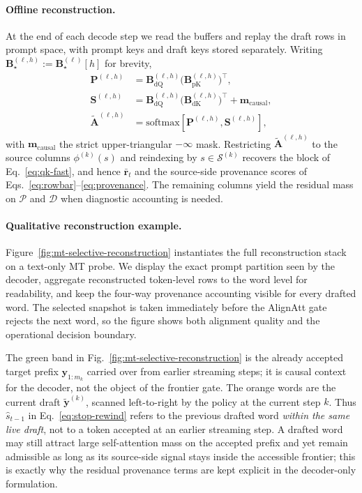 \documentclass[11pt,twocolumn]{article}
\begin{document}
\paragraph{Offline reconstruction.}
At the end of each decode step we read the buffers and replay the draft rows in
prompt space, with prompt keys and draft keys stored separately.
Writing $\mathbf{B}^{(\ell,h)}_\star := \mathbf{B}^{(\ell)}_\star[h]$ for brevity,
\begin{align}
  \mathbf{P}^{(\ell,h)} &=
  \mathbf{B}^{(\ell,h)}_{\mathrm{dQ}}
  \bigl(\mathbf{B}^{(\ell,h)}_{\mathrm{pK}}\bigr)^{\!\top},
  \label{eq:prompt-logits}\\
  \mathbf{S}^{(\ell,h)} &=
  \mathbf{B}^{(\ell,h)}_{\mathrm{dQ}}
  \bigl(\mathbf{B}^{(\ell,h)}_{\mathrm{dK}}\bigr)^{\!\top}
  + \mathbf{m}_{\mathrm{causal}},
  \label{eq:suffix-logits}\\
  \widetilde{\mathbf{A}}^{(\ell,h)}
  &= \mathrm{softmax}[\mathbf{P}^{(\ell,h)}, \mathbf{S}^{(\ell,h)}],
  \label{eq:vllm-softmax}
\end{align}
with $\mathbf{m}_{\mathrm{causal}}$ the strict upper-triangular $-\infty$
mask. Restricting $\widetilde{\mathbf{A}}^{(\ell,h)}$ to the source columns
$\phi^{(k)}(s)$ and reindexing by $s \in \mathcal{S}^{(k)}$ recovers the block
of Eq.~\eqref{eq:qk-fast}, and hence $\bar{\mathbf{r}}_t$ and the source-side
provenance scores of Eqs.~\eqref{eq:rowbar}--\eqref{eq:provenance}. The
remaining columns yield the residual mass on $\mathcal{P}$ and $\mathcal{D}$
when diagnostic accounting is needed.

\paragraph{Qualitative reconstruction example.}
Figure~\ref{fig:mt-selective-reconstruction} instantiates the full
reconstruction stack on a text-only MT probe. We display the exact prompt
partition seen by the decoder, aggregate reconstructed token-level rows to the
word level for readability, and keep the four-way provenance accounting visible
for every drafted word. The selected snapshot is taken immediately before the
AlignAtt gate rejects the next word, so the figure shows both alignment quality
and the operational decision boundary.


The green band in Fig.~\ref{fig:mt-selective-reconstruction} is the already
accepted target prefix $\mathbf{y}_{1:m_k}$ carried over from earlier
streaming steps; it is causal context for the decoder, not the object of the
frontier gate. The orange words are the current draft
$\widetilde{\mathbf{y}}^{(k)}$, scanned left-to-right by the policy at the
current step $k$. Thus $\hat{s}_{t-1}$ in Eq.~\eqref{eq:stop-rewind} refers to
the previous drafted word \emph{within the same live draft}, not to a token
accepted at an earlier streaming step. A drafted word may still attract large
self-attention mass on the accepted prefix and yet remain admissible as long as
its source-side signal stays inside the accessible frontier; this is exactly
why the residual provenance terms are kept explicit in the decoder-only
formulation.

\end{document}
